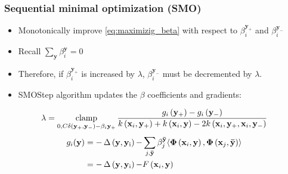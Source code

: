 \begin{frame}
    \frametitle{Sequential minimal optimization (SMO)}
    \begin{itemize}
        \item Monotonically improve \eqref{eq:maximizig_beta} with respect to
            \(\beta_i^{\mathbf{y}_+}\) and \(\beta_i^{\mathbf{y}_-}\) 
        \item Recall \( \sum_\mathbf{y} \beta_i^\mathbf{y} = 0 \)
        \item Therefore, if \( \beta_i^{\mathbf{y}_+} \) is increased by \(\lambda\),
            \( \beta_i^{\mathbf{y}_-} \) must be decremented by \(\lambda\).
        \item SMOStep algorithm updates the \(\beta\) coefficients and gradients:
    \end{itemize}
    \begin{equation}
        \lambda = \operatorname*{clamp}_{0, C\delta\left(\mathbf{y}_+, \mathbf{y}_-\right) - \beta_i{\mathbf{y}_+}}
        \frac{g_i\left(\mathbf{y}_+\right)-g_i\left(\mathbf{y}_-\right)}
             {k\left(\mathbf{x}_i, \mathbf{y}_+\right) + k\left(\mathbf{x}_i, \mathbf{y}\right)
             -2k\left(\mathbf{x}_i, \mathbf{y}_+, \mathbf{x}_i, \mathbf{y}_-\right)}
    \end{equation}
    \begin{equation} \label{eq:gradient}
        \begin{aligned}
            g_i(\mathbf{y}) &= -\operatorname{\Delta \left( \mathbf{y}, \mathbf{y}_i \right)} - \sum_{j, \mathbf{\bar{y}}} \beta_j^\mathbf{\bar{y}}
            \langle \mathbf{\Phi}\left(\mathbf{x}_i, \mathbf{y}\right), \mathbf{\Phi}\left(\mathbf{x}_j,
            \mathbf{\bar{y}}\right) \rangle \\
            &= -\operatorname{\Delta \left( \mathbf{y}, \mathbf{y}_i \right)} - F\left(\mathbf{x}_i, \mathbf{y}\right)
        \end{aligned}
    \end{equation}
\end{frame}

%

